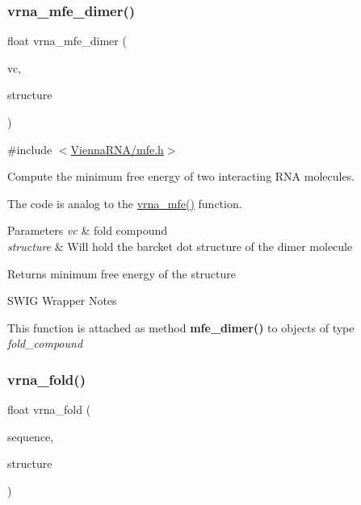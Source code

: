 \subsubsection{\texorpdfstring{vrna\_mfe\_dimer()}{vrna\_mfe\_dimer()}}
{\footnotesize\ttfamily float vrna\+\_\+mfe\+\_\+dimer (\begin{DoxyParamCaption}\item[{\mbox{\hyperlink{group__fold__compound_ga1b0cef17fd40466cef5968eaeeff6166}{vrna\+\_\+fold\+\_\+compound\+\_\+t}} $\ast$}]{vc,  }\item[{char $\ast$}]{structure }\end{DoxyParamCaption})}



{\ttfamily \#include $<$\mbox{\hyperlink{mfe_8h}{Vienna\+R\+N\+A/mfe.\+h}}$>$}



Compute the minimum free energy of two interacting R\+NA molecules. 

The code is analog to the \mbox{\hyperlink{group__mfe__global_gabd3b147371ccf25c577f88bbbaf159fd}{vrna\+\_\+mfe()}} function.


\begin{DoxyParams}{Parameters}
{\em vc} & fold compound \\
\hline
{\em structure} & Will hold the barcket dot structure of the dimer molecule \\
\hline
\end{DoxyParams}
\begin{DoxyReturn}{Returns}
minimum free energy of the structure
\end{DoxyReturn}
\begin{DoxyRefDesc}{S\+W\+I\+G Wrapper Notes}
\item[\mbox{\hyperlink{wrappers__wrappers000089}{S\+W\+I\+G Wrapper Notes}}]This function is attached as method {\bfseries{mfe\+\_\+dimer()}} to objects of type {\itshape fold\+\_\+compound} \end{DoxyRefDesc}
\mbox{\label{group__mfe__global_ga29a33b2895f4e67b0480271ff289afdc}} 
\subsubsection{\texorpdfstring{vrna\_fold()}{vrna\_fold()}}
{\footnotesize\ttfamily float vrna\+\_\+fold (\begin{DoxyParamCaption}\item[{const char $\ast$}]{sequence,  }\item[{char $\ast$}]{structure }\end{DoxyParamCaption})}



